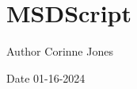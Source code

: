 \chapter{MSDScript}
\hypertarget{index}{}\label{index}
\begin{DoxyAuthor}{Author}
Corinne Jones 
\end{DoxyAuthor}
\begin{DoxyDate}{Date}
01-\/16-\/2024 
\end{DoxyDate}
